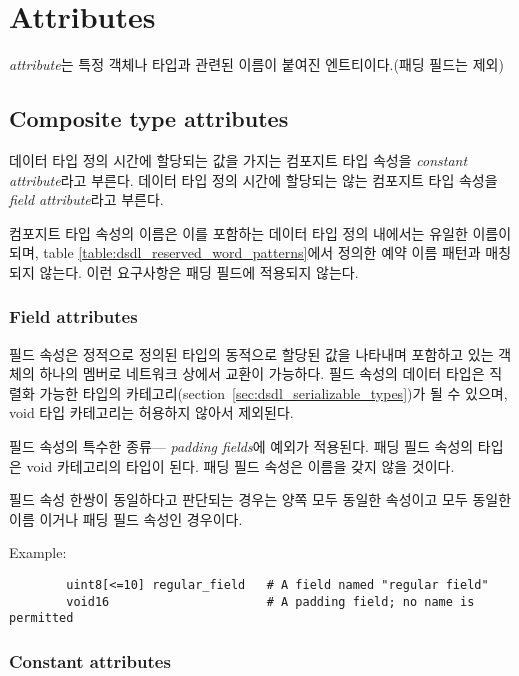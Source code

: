 \section{Attributes}\label{sec:dsdl_attributes}

\emph{attribute}는 특정 객체나 타입과 관련된 이름이 붙여진 엔트티이다.(패딩 필드는 제외)

\subsection{Composite type attributes}

데이터 타입 정의 시간에 할당되는 값을 가지는 컴포지트 타입 속성을 \emph{constant attribute}라고 부른다.
데이터 타입 정의 시간에 할당되는 않는 컴포지트 타입 속성을 \emph{field attribute}라고 부른다.

컴포지트 타입 속성의 이름은 이를 포함하는 데이터 타입 정의 내에서는 유일한 이름이 되며,
table
\ref{table:dsdl_reserved_word_patterns}에서 정의한 예약 이름 패턴과 매칭되지 않는다.
이런 요구사항은 패딩 필드에 적용되지 않는다.

\subsubsection{Field attributes}

필드 속성은 정적으로 정의된 타입의 동적으로 할당된 값을 나타내며 포함하고 있는 객체의 하나의 멤버로 네트워크 상에서 교환이 가능하다.
필드 속성의 데이터 타입은 직렬화 가능한 타입의 카테고리(section~\ref{sec:dsdl_serializable_types})가 될 수 있으며,
void 타입 카테고리는 허용하지 않아서 제외된다.

필드 속성의 특수한 종류--- \emph{padding fields}에 예외가 적용된다.
패딩 필드 속성의 타입은 void 카테고리의 타입이 된다.
패딩 필드 속성은 이름을 갖지 않을 것이다.

필드 속성 한쌍이 동일하다고 판단되는 경우는 양쪽 모두 동일한 속성이고 모두 동일한 이름 이거나 패딩 필드 속성인 경우이다.

\begin{remark}
    Example:
    \begin{verbatim}
        uint8[<=10] regular_field   # A field named "regular field"
        void16                      # A padding field; no name is permitted
    \end{verbatim}
\end{remark}

\subsubsection{Constant attributes}

